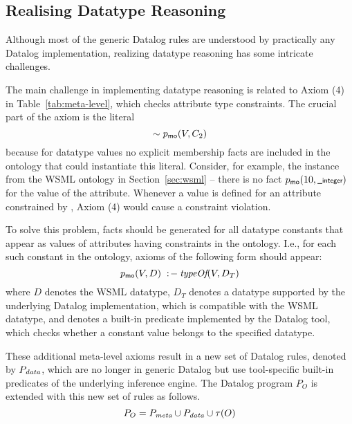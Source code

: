 \def\dataaxioms{\ensuremath{P_{\smtxtit{data}}}\xspace}
\def\transdpred{\transtxt{dpred}}

\subsection{Realising Datatype Reasoning}
\label{sec:datatype_reasoning} Although most of the generic
Datalog rules are understood by practically any Datalog
implementation, realizing datatype reasoning has some intricate
challenges.

The main challenge in implementing datatype reasoning is related
to Axiom (4) in Table~\ref{tab:meta-level}, which checks attribute
type constraints. The crucial part of the axiom is the literal
\[\sim p_{\mathrm{\sf mo}}(V,C_2)\] because for datatype values no explicit
membership facts are included in the ontology that could
instantiate this literal. Consider, for example, the instance
 from the WSML ontology in Section~\ref{sec:wsml}
-- there is no fact $p_{\mathrm{\sf mo}}(10,\textsf{\scriptsize \_integer})$ for the value of
the  attribute. Whenever a value is defined
for an attribute constrained by , Axiom (4) would
cause a constraint violation.

To solve this problem, \pmo facts should be generated for all
datatype constants that appear as values of attributes having  constraints in the ontology. 
I.e., for each such constant in the ontology,
axioms of the following form should appear:
\begin{displaymath}
    p_{\mathrm{\sf mo}}(V,D) \;:\!-\: \textit{typeOf}(V, D_T)
\end{displaymath}
where $D$ denotes the WSML datatype, $D_T$ denotes a datatype
supported by the underlying Datalog implementation, which is
compatible with the WSML datatype, and \typeof denotes a built-in
predicate implemented by the Datalog tool, which checks whether a
constant value belongs to the specified datatype.

These additional meta-level axioms result in a new set of Datalog
rules, denoted by \dataaxioms, which are no longer in generic
Datalog but use tool-specific built-in predicates of the
underlying inference engine. The Datalog program $P_O$ is extended
with this new set of rules as follows.
\begin{displaymath}
    P_O = \mlaxioms \cup \dataaxioms \cup \tau(O)
\end{displaymath}

